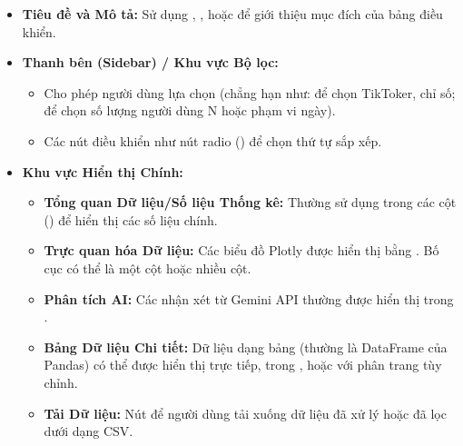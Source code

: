 \begin{itemize}
    \item \textbf{Tiêu đề và Mô tả:} Sử dụng , ,  hoặc  để giới thiệu mục đích của bảng điều khiển.

    \item \textbf{Thanh bên (Sidebar) / Khu vực Bộ lọc:}
    \begin{itemize}
        \item Cho phép người dùng lựa chọn (chẳng hạn như:  để chọn TikToker, chỉ số;  để chọn số lượng người dùng N hoặc phạm vi ngày).
        \item Các nút điều khiển như nút radio () để chọn thứ tự sắp xếp.
    \end{itemize}
    
    \item \textbf{Khu vực Hiển thị Chính:}
    \begin{itemize}
        \item \textbf{Tổng quan Dữ liệu/Số liệu Thống kê:} Thường sử dụng  trong các cột () để hiển thị các số liệu chính.
    
        \item \textbf{Trực quan hóa Dữ liệu:} Các biểu đồ Plotly được hiển thị bằng . Bố cục có thể là một cột hoặc nhiều cột.
        
        \item \textbf{Phân tích AI:} Các nhận xét từ Gemini API thường được hiển thị trong .
        
        \item \textbf{Bảng Dữ liệu Chi tiết:} Dữ liệu dạng bảng (thường là DataFrame của Pandas) có thể được hiển thị trực tiếp, trong , hoặc với phân trang tùy chỉnh.
        
        \item \textbf{Tải Dữ liệu:} Nút  để người dùng tải xuống dữ liệu đã xử lý hoặc đã lọc dưới dạng CSV.
    \end{itemize}
\end{itemize}





